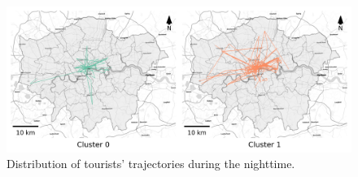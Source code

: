 \documentclass{article}
\theoremstyle{definition}
\theoremstyle{remark}
\begin{document}
\begin{figure}[!h]
\centering
\includegraphics[width=1\textwidth]{figures/traj_distribution_nighttime_tourists.png}
\caption{\label{fig:traj_distribution_nighttime_tourists}Distribution of tourists' trajectories during the nighttime.}
\end{figure}
\end{document}
